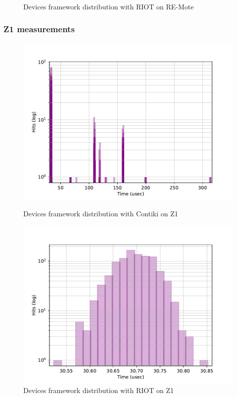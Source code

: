 \begin{figure}[!ht]
\begin{minipage}{.45\textwidth}
      \caption{Devices framework distribution with RIOT on RE-Mote\label{fig:comparison-devices-framework-riot-remote}}
  \end{minipage}
\end{figure}

\subsubsection{Z1 measurements}



\begin{figure}[!ht]
  \begin{minipage}{.45\textwidth}
      \centering
      \includegraphics[scale=.4]{assets/devices-framework-contiki-z1.pdf}
      \caption{Devices framework distribution with Contiki on Z1\label{fig:comparison-devices-framework-contiki-z1}}
  \end{minipage}\hfill
  \begin{minipage}{.45\textwidth}        
      \centering
      \includegraphics[scale=.4]{assets/devices-framework-riot-z1.pdf}
      \caption{Devices framework distribution with RIOT on Z1\label{fig:comparison-devices-framework-riot-z1}}
  \end{minipage}
\end{figure}

